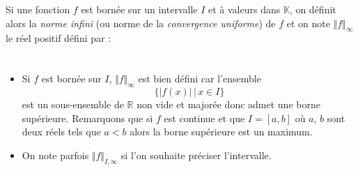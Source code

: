 \documentclass[french,11pt,twoside]{VcCours}
\begin{document}


\begin{Definition}{} Si une fonction $f$ est bornée sur un intervalle $I$ et à valeurs dans $\mathbb{K}$, on définit alors la \emph{norme infini} (ou norme de la \emph{convergence uniforme}) de $f$ et on note $\Vert f \Vert_{\infty}$ le réel positif défini par :
$$ \phantom{\Vert f \Vert_{\infty} = \sup_{x \in I} \vert f(x) \vert} $$
\end{Definition}

\begin{Remarques}{}
\begin{itemize} 
\item Si $f$ est bornée sur $I$, $\Vert f \Vert_{\infty}$ est bien défini car l'ensemble 
$$ \lbrace \vert f(x) \vert \, \vert \, x \in I \rbrace$$
est un sous-ensemble de $\mathbb{R}$ non vide et majorée donc admet une borne supérieure. Remarquons que si $f$ est continue et que $I= [a,b]$ où $a$, $b$ sont deux réels tels que $a<b$ alors la borne supérieure est un maximum.
\item On note parfois $\Vert f \Vert_{I,\infty}$ si l'on souhaite préciser l'intervalle.
\end{itemize}
\end{Remarques}{} 
\end{document}
